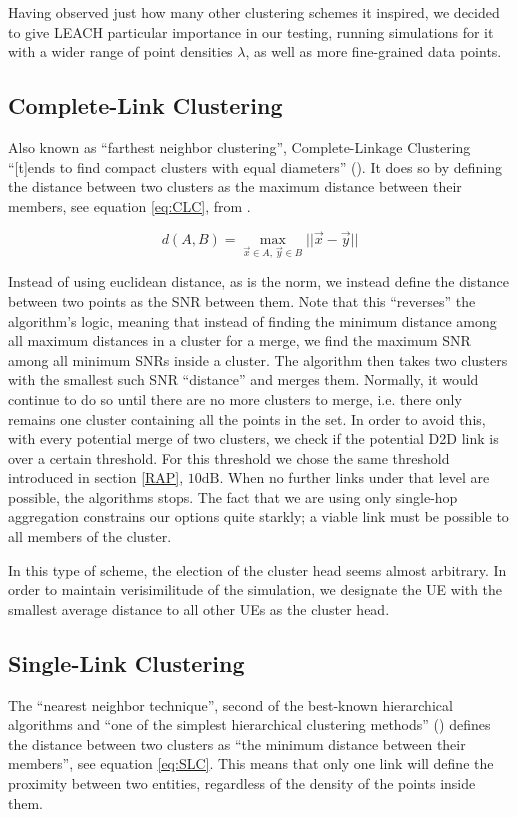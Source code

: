Having observed just how many other clustering schemes it inspired, we decided to give LEACH particular importance in our testing, running simulations for it with a wider range of point densities $\lambda$, as well as more fine-grained data points.


\subsection{Complete-Link Clustering}\label{CLC}
Also known as ``farthest neighbor clustering'', Complete-Linkage Clustering ``[t]ends to find compact clusters with equal diameters'' (\cite{Everitt2011}). It does so by defining the distance between two clusters as the maximum distance between their members, see equation \ref{eq:CLC}, from \cite{Shalizi2009}. 

\begin{equation}\label{eq:CLC}
d(A,B) = \max_{\vec{x} \in A,\,\vec{y} \in B} ||\vec{x}  - \vec{y}||
\end{equation}


Instead of using euclidean distance, as is the norm, we instead define the distance between two points as the SNR between them. Note that this ``reverses'' the algorithm's logic, meaning that instead of finding the minimum distance among all maximum distances in a cluster for a merge, we find the maximum SNR among all minimum SNRs inside a cluster. The algorithm then takes two clusters with the smallest such SNR ``distance'' and merges them.  Normally, it would continue to do so until there are no more clusters to merge, i.e. there only remains one cluster containing all the points in the set. In order to avoid this, with every potential merge of two clusters, we check if the potential D2D link is over a certain threshold. For this threshold we chose the same threshold introduced in section \ref{RAP}, $10 \text{dB}$. When no further links under that level are possible, the algorithms stops. The fact that we are using only single-hop aggregation constrains our options quite starkly; a viable link must be possible to all members of the cluster.

In this type of scheme, the election of the cluster head seems almost arbitrary. In order to maintain verisimilitude of the simulation, we designate the UE with the smallest average distance to all other UEs as the cluster head.

\subsection{Single-Link Clustering}\label{SLC}
The ``nearest neighbor technique'', second of the best-known hierarchical algorithms and ``one of the simplest hierarchical clustering methods'' (\cite{Everitt2011}) defines the distance between two clusters as ``the minimum distance between their members'', see equation \ref{eq:SLC}. This means that only one link will define the proximity between two entities, regardless of the density of the points inside them.

